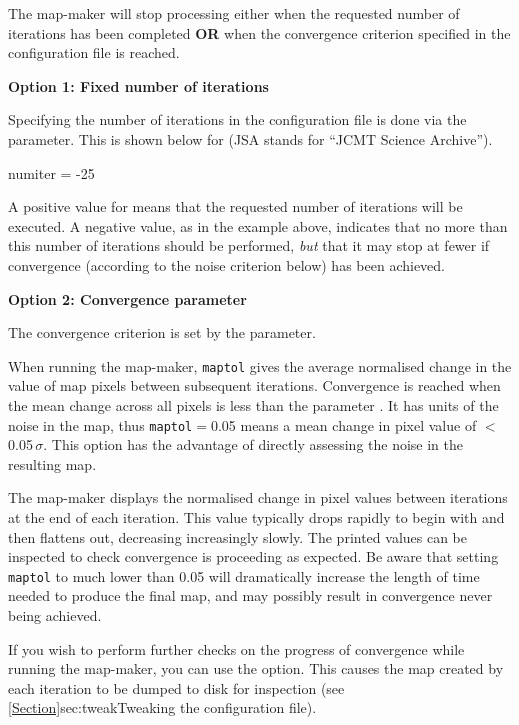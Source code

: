The map-maker will stop processing either when the requested number of
iterations has been completed \textbf{OR} when the convergence
criterion specified in the configuration file is reached.


\textbf{Option 1: Fixed number of iterations}

Specifying the number of iterations in the configuration file is done
via the  parameter. This is shown below for
 (JSA stands for ``JCMT Science Archive'').

\begin{terminalv}
numiter = -25
\end{terminalv}

A positive value for  means that the requested number
of iterations will be executed. A negative value, as in the example
above, indicates that no more than this number of iterations should be
performed, \emph{but} that it may stop at fewer if convergence
(according to the noise criterion below) has been achieved.

\textbf{Option 2: Convergence parameter}

The convergence criterion is set by the  parameter.

When running the map-maker, \texttt{maptol} gives the average
normalised change in the value of map pixels
between subsequent iterations. Convergence is reached when the  mean
change across all pixels is less than the parameter .
It has units of the noise in the map, thus \texttt{maptol}$=$0.05 means
a mean change in pixel value of $<$0.05\,$\sigma$. This option has the
advantage of directly assessing the noise in the resulting map.

The map-maker displays the normalised change in pixel values between
iterations at the end of each iteration. This value typically drops
rapidly to begin with and then flattens out, decreasing increasingly
slowly.  The printed values can be inspected to check convergence is
proceeding as expected. Be aware that setting \texttt{maptol} to much
lower than 0.05 will dramatically increase the length of time needed to
produce the final map, and may possibly result in convergence never being
achieved.

If you wish to perform further checks on the progress of convergence
while running the map-maker, you can use the 
option. This causes the map created by each iteration to be dumped to
disk for inspection (see \cref{Section}{sec:tweak}{Tweaking the
configuration file}).

